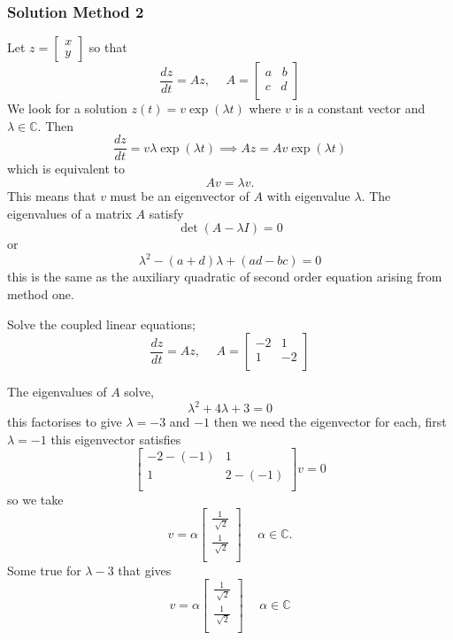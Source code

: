 \subsubsection*{Solution Method 2}
Let $z = \begin{bmatrix}
x \\ 
y
\end{bmatrix}$ so that $$\frac{dz}{dt}= Az, \hspace{15pt} A = \begin{bmatrix}
a \hspace{10pt} b \\
c \hspace{10pt} d \\
\end{bmatrix}$$ We look for a solution $z(t) = v \exp(\lambda t)$ where $v$ is a constant vector and $\lambda \in \mathbb{C}.$ Then $$ \frac{dz}{dt} = v \lambda\exp(\lambda t) \implies Az = Av \exp(\lambda t)$$ which is equivalent to $$Av = \lambda v.$$
This means that $v$ must be an eigenvector of $A$ with eigenvalue $\lambda.$ The eigenvalues of a matrix $A$ satisfy $$\det(A - \lambda I ) = 0 $$ or  $$\lambda^2 -(a+d)\lambda +(ad-bc) = 0 $$ this is the same as the auxiliary quadratic of second order equation arising from method one.

\begin{example}
\smallskip
Solve the coupled linear equations;
$$\frac{dz}{dt} = Az, \hspace{15pt} A=\begin{bmatrix}
-2 &1 \\
1 & -2 \\
\end{bmatrix}$$
\begin{solution}
The eigenvalues of $A$ solve, $$\lambda^2 +4\lambda +3 = 0 $$ this factorises to give $\lambda = -3$ and $-1$ then we need the eigenvector for each, first $\lambda = -1$ this eigenvector satisfies $$\begin{bmatrix}
-2- (-1) & 1\\
1 & 2-(-1)\\
\end{bmatrix}v =0$$ so we take  $$v = \alpha \begin{bmatrix}
\frac{1}{\sqrt[]{2}}\\
\frac{1}{\sqrt[]{2}}\\
\end{bmatrix} \hspace{15pt} \alpha \in \mathbb{C}.$$
Some true for $\lambda -3$ that gives 
$$v = \alpha \begin{bmatrix}
\frac{1}{\sqrt[]{2}}\\
\frac{1}{\sqrt[]{2}}\\
\end{bmatrix} \hspace{15pt} \alpha \in \mathbb{C}$$
\end{solution}
\end{example}


\endinput
